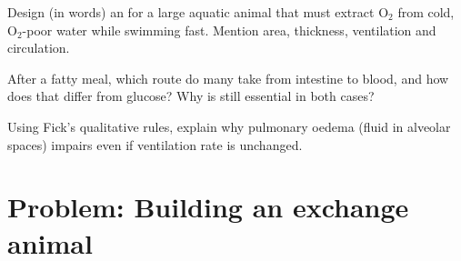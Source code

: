 \begin{exercise}[$\star\star\star$]\label{exo:g12:animal-exchange:10}
Design (in words) an  for a large aquatic animal that
must extract O$_2$ from cold, O$_2$-poor water while swimming fast.
Mention area, thickness, ventilation and circulation.
\end{exercise}

\begin{exercise}[$\star\star\star$]\label{exo:g12:animal-exchange:11}
After a fatty meal, which route do many  take from intestine to
blood, and how does that differ from glucose? Why is  still
essential in both cases?
\end{exercise}

\begin{exercise}[$\star\star\star$]\label{exo:g12:animal-exchange:12}
Using Fick's qualitative rules, explain why pulmonary oedema (fluid in
alveolar spaces) impairs  even if ventilation rate is
unchanged.
\end{exercise}

\section{Problem: Building an exchange animal}

